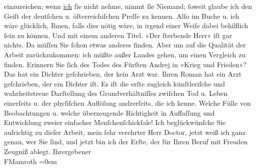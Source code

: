 \begin{ledgroupsized}[t]{13cm}
               einzureichen; wenn \uline{ich}{ }ſie nicht nehme, nimmt ſie Niemand; ſoweit glaube
               ich den Geiſt der deutſchen u. öſterreichiſchen Preſſe zu kennen. Alſo im Buche
               u. ich wäre glücklich, Ihnen, falls dies nötig wäre, in irgend einer Weiſe dabei
               behilflich ſein zu können. Und mit einem anderen Titel. »Der ſterbende Herr« iſt gar nichts. Da müſſen Sie ſchon etwas
               anderes finden. Aber um auf die Qualität der Arbeit zurückzukommen: ich müßte außer
               Landes gehen, um einen Vergleich zu finden. Erinnern Sie ſich des Todes des Fürſten
               Andrej in »Krieg und Frieden«? Das hat ein Dichter geſchrieben, der kein
               Arzt war. Ihren Roman hat ein Arzt geſchrieben, der ein Dichter iſt. Es iſt die erſte
               zugleich künſtleriſche und wahrheitstreue Darſtellung des Grundverhältniſſes zwiſchen
               Tod u. Leben einerſeits u. der phyſiſchen Auflöſung andrerſeits, die ich kenne.
               Welche Fülle von Beobachtungen u. welche überzeugende Richtigkeit in Auffaſſung und
               Entwicklung zweier einfacher Menſchenſchickſale! Ich beglückwünſche Sie aufrichtig zu
               dieſer Arbeit, mein ſehr verehrter Herr Doctor, jetzt weiß ich ganz genau, wer Sie
               ſind, und jetzt bin ich der Erſte, der für Ihren Beruf mit Freuden Zeugniß
               ablegt.\pend
           \pstart
           Ihr\hspace*{1.5em}ergebener{\\[\baselineskip]}\spacefill\mbox{FMamroth}\pend
           \leftskip=0em{}
         
         \endnumbering{}\end{ledgroupsized}  \newcommand{\dateiname}{L00186}\newcommand{\titel}{Fedor Mamroth an Arthur Schnitzler, 5. 3. 1893}\newcommand{\editorInnen}{Martin Anton Müller und Gerd-Hermann Susen}
      